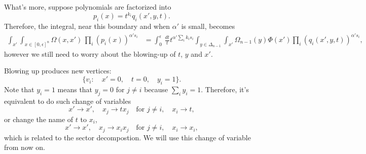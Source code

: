 \documentclass[12pt]{article}
\theoremstyle{definition}
\theoremstyle{plain}
\begin{document}



What's more, suppose polynomials are factorized into
\[
	p_i(x) = t^{k_i}q_i(x',y,t).
\]
Therefore, the integral, near this boundary and when $\alpha'$ is small, becomes
\[
	\begin{aligned}
		\int_{x'} \int_{x\in [0,\epsilon]^n} \Omega(x,x')\, \prod_i(p_i(x))^{\alpha' s_i}
		&=
		\int_0^\epsilon \, \frac{dt}{t} t^{\alpha' \sum_i k_is_i}\int_{y\in\Delta_{n-1}}\int_{x'}\Omega_{n-1}(y)
		\Phi(x')\prod_i
		(q_i(x',y,t))^{\alpha' s_i},
	\end{aligned}
\]
however we still need to worry about the blowing-up of $t$, $y$ and $x'$.

Blowing up produces new vertices: 
\[
	\{v_i:\quad x'=0,\quad t=0,\quad y_i=1\}.
\]
Note that $y_i=1$ means that $y_j=0$ for $j\neq i$ because $\sum_i y_i=1$. Therefore, it's equivalent to 
do such change of variables
\[
	x'\to x',\quad x_j\to tx_j\quad \text{for $j\neq i$},\quad x_i\to t,
\]
or change the name of $t$ to $x_i$,
\[
	x'\to x',\quad x_j\to x_ix_j\quad \text{for $j\neq i$},\quad x_i\to x_i,
\]
which is related to the sector decompostion. We will use this change of variable from
now on.
\end{document}
